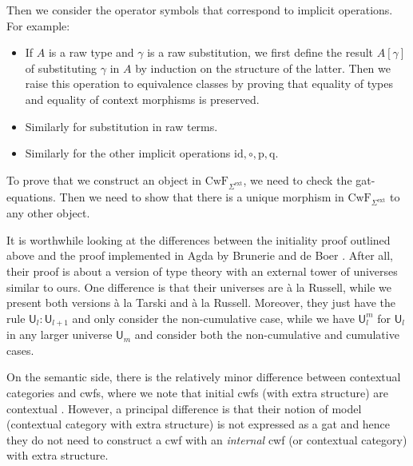 \documentclass[11pt,a4paper]{article}
\theoremstyle{plain}
\theoremstyle{definition}
\newcommand{\id}{\mathsf{id}}
\newcommand{\UU}{\mathsf{U}}
\def\UU{\mathsf{U}}
\def\id{\mathrm{id}}
\def\p{\mathrm{p}}
\def\q{\mathrm{q}}
\def\CwF{\mathrm{CwF}}
\def\Sigmaext{{\Sigma^\mathrm{ext}}}
\begin{document}
Then we consider the operator symbols that correspond to implicit operations. For example:
\begin{itemize}
\item If $A$ is a raw type and $\gamma$ is a raw substitution, we first define the result $A[\gamma]$ of substituting $\gamma$ in $A$ by induction on the structure of the latter. Then we raise this operation to equivalence classes by proving that equality of types and equality of context morphisms is preserved.
\item Similarly for substitution in raw terms.
\item Similarly for the other implicit operations $\id, \circ, \p, \q$.
\end{itemize}
To prove that we construct an object in $\CwF_\Sigmaext$, we need to check the gat-equations. Then we need to show that there is a unique morphism in $\CwF_\Sigmaext$ to any other object.

It is worthwhile looking at the differences between the initiality proof outlined above and the proof implemented in Agda by Brunerie and de Boer \cite{Brunerie:initiality,deBoer:lic}. After all, their proof is about a version of type theory with an external tower of universes similar to ours. One difference is that their universes are \`a la Russell, while we present both versions \`a la Tarski and \`a la Russell. Moreover, they just have the rule $\UU_l : \UU_{l+1}$ and only consider the non-cumulative case, while we have $\UU_l^m$ for $\UU_l$ in any larger universe $\UU_m$ and consider both the non-cumulative and cumulative cases.

On the semantic side, there is the relatively minor difference between contextual categories and cwfs, where we note that initial cwfs (with extra structure) are contextual \cite{ClairambaultD11,castellan:lambek}. However, a principal difference is that their notion of model (contextual category with extra structure) is not expressed as a gat and hence they do not need to construct a cwf with an {\em internal} cwf (or contextual category) with extra structure.
\end{document}
